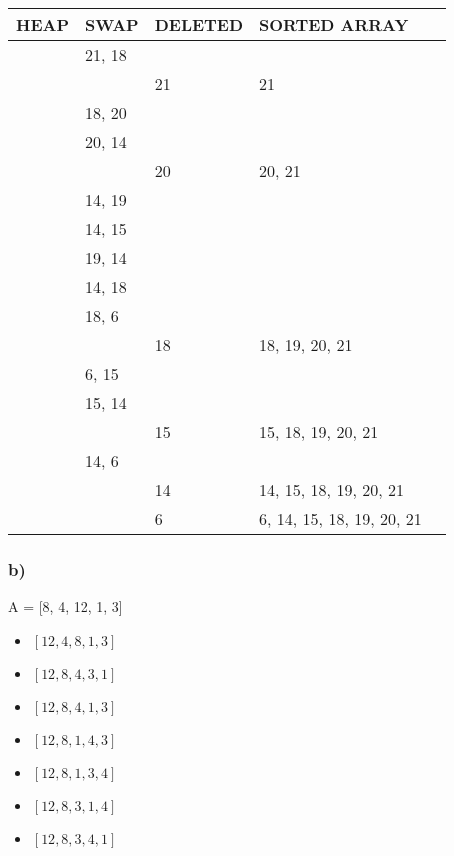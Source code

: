 \documentclass[a4paper,fleqn]{scrartcl}
\begin{document}
\begin{tabular}{l|l|l|l|l}
    HEAP & SWAP & DELETED & SORTED ARRAY \\
    \hline
    \hline
    [21, 19, 20, 6, 15, 14, 18] & 21, 18 &    &    \\
    \hline
    [18, 19, 20, 6, 15, 14, 21] &        & 21 & 21 \\
    \hline
    [18, 19, 20, 6, 15, 14]     & 18, 20 &    &    \\
    \hline
    [20, 19, 18, 6, 15, 14]     & 20, 14 &    &    \\
    \hline
    [14, 19, 18, 6, 15, 20]     &        & 20 & 20, 21 \\
    \hline
    [14, 19, 18, 6, 15]         & 14, 19 &    &    \\
    \hline
    [19, 14, 18, 6, 15]         & 14, 15 &    &    \\
    \hline
    [19, 15, 18, 6, 14]         & 19, 14 &    &    \\
    \hline
    [14, 15, 18, 6, 19          &        & 19 & 19, 20, 21 \\
    \hline
    [14, 15, 18, 6]             & 14, 18 &    &    \\
    \hline
    [18, 15, 14, 6]             & 18, 6  &    &    \\
    \hline
    [6, 15, 14, 18]             &        & 18 & 18, 19, 20, 21 \\
    \hline
    [6, 15, 14]                 & 6, 15  &    &    \\
    \hline
    [15, 6, 14]                 & 15, 14 &    &    \\
    \hline
    [14, 6, 15]                 &        & 15 & 15, 18, 19, 20, 21 \\
    \hline
    [14, 6]                     & 14, 6  &    &    \\
    \hline 
    [6, 14]                     &        & 14 & 14, 15, 18, 19, 20, 21 \\
    \hline
    [6]                         &        &  6 & 6, 14, 15, 18, 19, 20, 21 \\
\end{tabular}

\subsubsection*{b)}
A = [8, 4, 12, 1, 3] \\

\begin{itemize}
  \item \([12, 4, 8, 1, 3]\)
  \item \([12, 8, 4, 3, 1]\)
  \item \([12, 8, 4, 1, 3]\)
  \item \([12, 8, 1, 4, 3]\)
  \item \([12, 8, 1, 3, 4]\)
  \item \([12, 8, 3, 1, 4]\)
  \item \([12, 8, 3, 4, 1]\)
\end{itemize}
\end{document}
